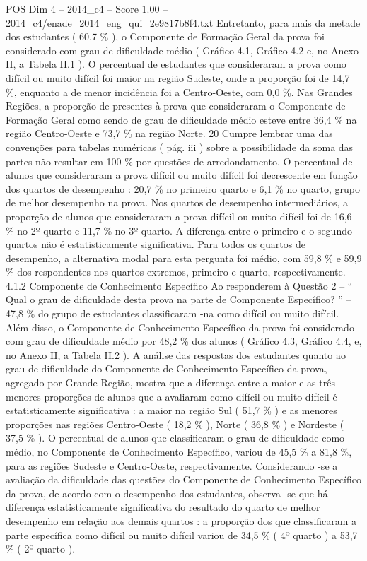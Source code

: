 \begin{textsample}{POS Dim 4 – 2014\_c4 – Score 1.00 – 2014\_c4/enade\_2014\_eng\_qui\_2e9817b8f4.txt}
Entretanto, para mais da metade dos estudantes ( 60,7 \% ), o Componente de Formação Geral da prova foi considerado com grau de dificuldade médio ( Gráfico 4.1, Gráfico 4.2 e, no Anexo II, a Tabela II.1 ).
O percentual de estudantes que consideraram a prova como difícil ou muito difícil foi maior na região Sudeste, onde a proporção foi de 14,7 \%, enquanto a de menor incidência foi a Centro-Oeste, com 0,0 \%.
Nas Grandes Regiões, a proporção de presentes à prova que consideraram o Componente de Formação Geral como sendo de grau de dificuldade médio esteve entre 36,4 \% na região Centro-Oeste e 73,7 \% na região Norte. 20 Cumpre lembrar uma das convenções para tabelas numéricas ( pág. iii ) sobre a possibilidade da soma das partes não resultar em 100 \% por questões de arredondamento.
O percentual de alunos que consideraram a prova difícil ou muito difícil foi decrescente em função dos quartos de desempenho : 20,7 \% no primeiro quarto e 6,1 \% no quarto, grupo de melhor desempenho na prova.
Nos quartos de desempenho intermediários, a proporção de alunos que consideraram a prova difícil ou muito difícil foi de 16,6 \% no 2º quarto e 11,7 \% no 3º quarto.
A diferença entre o primeiro e o segundo quartos não é estatisticamente significativa.
Para todos os quartos de desempenho, a alternativa modal para esta pergunta foi médio, com 59,8 \% e 59,9 \% dos respondentes nos quartos extremos, primeiro e quarto, respectivamente. 4.1.2 Componente de Conhecimento Específico Ao responderem à Questão 2 – “ Qual o grau de dificuldade desta prova na parte de Componente Específico? ” – 47,8 \% do grupo de estudantes classificaram -na como difícil ou muito difícil.
Além disso, o Componente de Conhecimento Específico da prova foi considerado com grau de dificuldade médio por 48,2 \% dos alunos ( Gráfico 4.3, Gráfico 4.4, e, no Anexo II, a Tabela II.2 ).
A análise das respostas dos estudantes quanto ao grau de dificuldade do Componente de Conhecimento Específico da prova, agregado por Grande Região, mostra que a diferença entre a maior e as três menores proporções de alunos que a avaliaram como difícil ou muito difícil é estatisticamente significativa : a maior na região Sul ( 51,7 \% ) e as menores proporções nas regiões Centro-Oeste ( 18,2 \% ), Norte ( 36,8 \% ) e Nordeste ( 37,5 \% ).
O percentual de alunos que classificaram o grau de dificuldade como médio, no Componente de Conhecimento Específico, variou de 45,5 \% a 81,8 \%, para as regiões Sudeste e Centro-Oeste, respectivamente.
Considerando -se a avaliação da dificuldade das questões do Componente de Conhecimento Específico da prova, de acordo com o desempenho dos estudantes, observa -se que há diferença estatisticamente significativa do resultado do quarto de melhor desempenho em relação aos demais quartos : a proporção dos que classificaram a parte específica como difícil ou muito difícil variou de 34,5 \% ( 4º quarto ) a 53,7 \% ( 2º quarto ).

\end{textsample}
